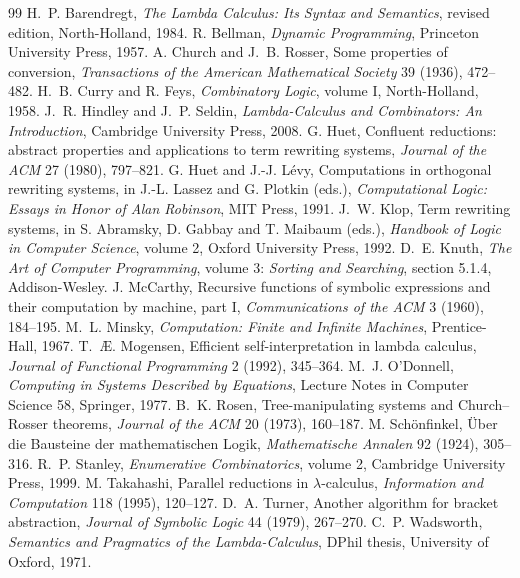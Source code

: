 \begin{thebibliography}{99}
 H.~P. Barendregt, \emph{The Lambda Calculus: Its Syntax and Semantics}, revised edition, North-Holland, 1984.
 R. Bellman, \emph{Dynamic Programming}, Princeton University Press, 1957.
 A. Church and J.~B. Rosser, Some properties of conversion, \emph{Transactions of the American Mathematical Society} 39 (1936), 472--482.
 H.~B. Curry and R. Feys, \emph{Combinatory Logic}, volume I, North-Holland, 1958.
 J.~R. Hindley and J.~P. Seldin, \emph{Lambda-Calculus and Combinators: An Introduction}, Cambridge University Press, 2008.
 G. Huet, Confluent reductions: abstract properties and applications to term rewriting systems, \emph{Journal of the ACM} 27 (1980), 797--821.
 G. Huet and J.-J. L\'evy, Computations in orthogonal rewriting systems, in J.-L. Lassez and G. Plotkin (eds.), \emph{Computational Logic: Essays in Honor of Alan Robinson}, MIT Press, 1991.
 J.~W. Klop, Term rewriting systems, in S. Abramsky, D. Gabbay and T. Maibaum (eds.), \emph{Handbook of Logic in Computer Science}, volume 2, Oxford University Press, 1992.
 D.~E. Knuth, \emph{The Art of Computer Programming}, volume 3: \emph{Sorting and Searching}, section 5.1.4, Addison-Wesley.
 J. McCarthy, Recursive functions of symbolic expressions and their computation by machine, part I, \emph{Communications of the ACM} 3 (1960), 184--195.
 M.~L. Minsky, \emph{Computation: Finite and Infinite Machines}, Prentice-Hall, 1967.
 T.~{\AE}. Mogensen, Efficient self-interpretation in lambda calculus, \emph{Journal of Functional Programming} 2 (1992), 345--364.
 M.~J. O'Donnell, \emph{Computing in Systems Described by Equations}, Lecture Notes in Computer Science 58, Springer, 1977.
 B.~K. Rosen, Tree-manipulating systems and Church--Rosser theorems, \emph{Journal of the ACM} 20 (1973), 160--187.
 M. Sch\"onfinkel, \"Uber die Bausteine der mathematischen Logik, \emph{Mathematische Annalen} 92 (1924), 305--316.
 R.~P. Stanley, \emph{Enumerative Combinatorics}, volume 2, Cambridge University Press, 1999.
 M. Takahashi, Parallel reductions in $\lambda$-calculus, \emph{Information and Computation} 118 (1995), 120--127.
 D.~A. Turner, Another algorithm for bracket abstraction, \emph{Journal of Symbolic Logic} 44 (1979), 267--270.
 C.~P. Wadsworth, \emph{Semantics and Pragmatics of the Lambda-Calculus}, DPhil thesis, University of Oxford, 1971.
\end{thebibliography}
